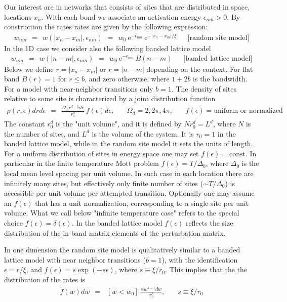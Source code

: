 \documentclass[onecolumn,fleqn,notitlepage,secnumarabic]{revtex4}
\newcommand{\const}{\mbox{const}}
\newcommand{\eexp}{\mbox{e}^}
\newcommand{\beq}{\begin{eqnarray}}
\newcommand{\eeq}{\end{eqnarray}}
\begin{document}
Our interest are in networks that consists of sites 
that are distributed in space, locations $x_n$.
With each bond we associate an activation energy $\epsilon_{nm}>0$. 
By construction the rates rates are given by the following expression:
%
\beq
w_{nm} \ \ = \ \  w(|x_n-x_m|,\epsilon_{nm})  \ \ = \ \  w_0 \ \eexp{-\epsilon_{nm}} \ \eexp{-|x_n-x_m|/\xi} 
\ \ \ \ \ \ \ \mbox{[random site model]}
\eeq
%
In the 1D case we consider also the following banded lattice model
%
\beq
w_{nm} \ \ = \ \  w(|n-m|,\epsilon_{nm})  \ \ = \ \  w_0 \ \eexp{-\epsilon_{nm}} \ B(n-m)
\ \ \ \ \ \ \ \mbox{[banded lattice model]}
\eeq
% 
Below we define $r=|x_n-x_m|$ or $r=|n-m|$ depending on the context.
For flat band $B(r)=1$ for ${r \leq b}$, and zero otherwise,  
where $1{+}2b$ is the bandwidth. For a model with near-neighbor transitions only $b=1$.
The density of sites relative to some site is characterized  by a joint distribution function 
%
\beq\label{eq:density_distribution}
\rho(r,\epsilon)drd\epsilon \ \ = \ \ \frac{\Omega_d \, r^{d-1}dr}{r_0^{d}} \ f(\epsilon)d\epsilon,     
\ \ \ \ \ \ \ \ \Omega_d=2,2\pi,4\pi, \ \ \ \ \ \ \ \ f(\epsilon)=\mbox{uniform or normalized}
\eeq
%
The constant $r_0^d$ is the "unit volume", and it is defined by $Nr_0^d = L^d$, 
where $N$ is the number of sites, and $L^d$ is the volume of the system.
It is ${r_0=1}$ in the banded lattice model, 
while in the random site model it sets the units of length.
%  
For a uniform distribution of sites in energy space one may set ${f(\epsilon)=\const}$.
In particular in the finite temperature Mott problem ${f(\epsilon)= T/\Delta_0}$,  
where $\Delta_0$ is the local mean level spacing per unit volume.
In such case in each location there are infinitely many sites, 
but effectively only finite number of sites ($\sim T/\Delta_0$) 
is accessible per unit volume per attempted transition.  
Optionally one may assume an $f(\epsilon)$ that has a unit normalization, 
corresponding to a single site per unit volume. 
What we call below "infinite temperature case" refers to 
the special choice $f(\epsilon)=\delta(\epsilon)$. 
In the banded lattice model $f(\epsilon)$ reflects the size distribution 
of the in-band matrix elements of the perturbation matrix. 

In one dimension the random site model is qualitatively similar 
to a banded lattice model with near neighbor transitions (${b=1}$),
with the identification $\epsilon=r/\xi$,   
and $f(\epsilon) = s\exp(-s\epsilon)$, where $s \equiv \xi/r_0$. 
This implies that the the distribution of the rates is 
%
\beq
\tilde{f}(w) dw  \ \  =  \ \    \ [w < w_0] \, \frac{s \, w^{s-1} dw}{w_0^s}, 
\ \ \ \ \ \ \ \ s \equiv \xi/r_0
\eeq
\end{document}
